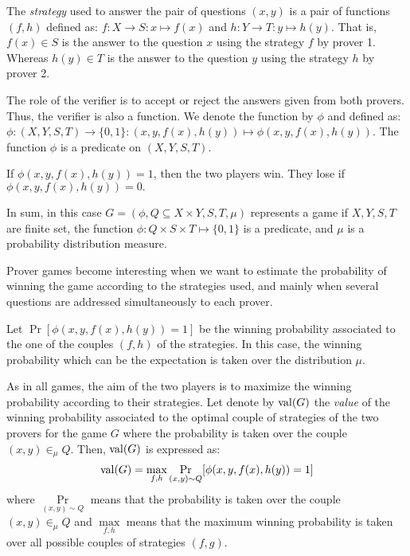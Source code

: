 The \textit{strategy} used to answer 
the pair of questions $(x,y)$
is a pair of functions $(f,h)$ defined as: $f: X \longrightarrow S: x \longmapsto f(x)$ and $h: Y \longrightarrow T: y \longmapsto h(y).$
That is, $f(x) \in S$ is the answer to the question $x$
using the strategy $f$ by prover 1. Whereas $h(y) \in T$ is the answer to the question $y$ using the strategy $h$ by prover 2.

The role of the verifier is to accept or reject the answers given from both provers. Thus, the verifier is also a function. We denote the function  
by $\phi$ and defined as: $\phi: (X,Y,S,T) \longrightarrow \{0,1\}: (x,y,f(x),h(y)) \longmapsto  \phi(x,y,f(x),h(y)).$ The function $\phi$ is a predicate on  $(X,Y,S,T).$

If $\phi(x,y,f(x),h(y))=1$, then the two players win. They lose if $\phi(x,y,f(x),h(y))=0.$ 

In sum, in this case $G=(\phi, Q\subseteq X \times Y, S,T, \mu)$ represents  a game if $X,Y,S,T$ are finite set,
the function $\phi: Q\times S \times T  \longmapsto \{0,1\}$ is a predicate, and $\mu$ is a probability distribution measure. 

Prover games become interesting when we want to estimate the probability of winning the game according to the strategies used, and mainly when several questions are addressed simultaneously  to each prover.

Let $\Pr[\phi(x,y,f(x),h(y))=1]$
be the winning probability associated to the one of the couples $(f,h)$ of the strategies. In this case, the winning probability \say{ $\Pr$} which can be the expectation is taken over the distribution $\mu.$

As in all games, the aim of the two players is to maximize the winning probability according to their strategies. Let denote by $\mathrm{val} (G)$ the \textit{value} of the winning probability associated to the optimal couple of strategies of the two provers for the game $G$ where the probability is taken over the couple $(x,y) \in_{\mu} Q$. Then, $\mathrm{val} (G)$ is expressed as: $$\mathrm{val} (G)=\max_{f,h}  \underset{(x,y) \sim Q}\Pr[\phi(x,y,f(x),h(y))=1]$$
where $\underset{(x,y) \sim Q}\Pr$ means that the probability is taken over the couple $(x,y) \in_{\mu} Q$ and $\max\limits_{f,h}$ means that the maximum winning probability  is taken over all possible couples of strategies $(f,g).$

